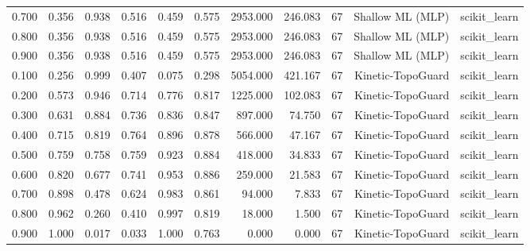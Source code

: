 \begin{tabular}{lrrrrrrrrrr}
0.700 & 0.356 & 0.938 & 0.516 & 0.459 & 0.575 & 2953.000 & 246.083 & 67 & Shallow ML (MLP) & scikit\_learn \\
0.800 & 0.356 & 0.938 & 0.516 & 0.459 & 0.575 & 2953.000 & 246.083 & 67 & Shallow ML (MLP) & scikit\_learn \\
0.900 & 0.356 & 0.938 & 0.516 & 0.459 & 0.575 & 2953.000 & 246.083 & 67 & Shallow ML (MLP) & scikit\_learn \\
0.100 & 0.256 & 0.999 & 0.407 & 0.075 & 0.298 & 5054.000 & 421.167 & 67 & Kinetic-TopoGuard & scikit\_learn \\
0.200 & 0.573 & 0.946 & 0.714 & 0.776 & 0.817 & 1225.000 & 102.083 & 67 & Kinetic-TopoGuard & scikit\_learn \\
0.300 & 0.631 & 0.884 & 0.736 & 0.836 & 0.847 & 897.000 & 74.750 & 67 & Kinetic-TopoGuard & scikit\_learn \\
0.400 & 0.715 & 0.819 & 0.764 & 0.896 & 0.878 & 566.000 & 47.167 & 67 & Kinetic-TopoGuard & scikit\_learn \\
0.500 & 0.759 & 0.758 & 0.759 & 0.923 & 0.884 & 418.000 & 34.833 & 67 & Kinetic-TopoGuard & scikit\_learn \\
0.600 & 0.820 & 0.677 & 0.741 & 0.953 & 0.886 & 259.000 & 21.583 & 67 & Kinetic-TopoGuard & scikit\_learn \\
0.700 & 0.898 & 0.478 & 0.624 & 0.983 & 0.861 & 94.000 & 7.833 & 67 & Kinetic-TopoGuard & scikit\_learn \\
0.800 & 0.962 & 0.260 & 0.410 & 0.997 & 0.819 & 18.000 & 1.500 & 67 & Kinetic-TopoGuard & scikit\_learn \\
0.900 & 1.000 & 0.017 & 0.033 & 1.000 & 0.763 & 0.000 & 0.000 & 67 & Kinetic-TopoGuard & scikit\_learn \\
\bottomrule
\end{tabular}